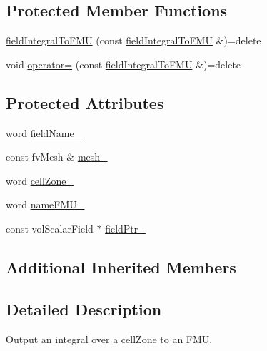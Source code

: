 \subsection*{Protected Member Functions}
\begin{DoxyCompactItemize}
\item 
\hyperlink{classFoam_1_1externalIOObject_1_1fieldIntegralToFMU_a6595a412b57d560957ed200ea1db6143}{field\+Integral\+To\+F\+MU} (const \hyperlink{classFoam_1_1externalIOObject_1_1fieldIntegralToFMU}{field\+Integral\+To\+F\+MU} \&)=delete
\item 
void \hyperlink{classFoam_1_1externalIOObject_1_1fieldIntegralToFMU_ad4a2e436a6117acae5d91778db665dcf}{operator=} (const \hyperlink{classFoam_1_1externalIOObject_1_1fieldIntegralToFMU}{field\+Integral\+To\+F\+MU} \&)=delete
\end{DoxyCompactItemize}
\subsection*{Protected Attributes}
\begin{DoxyCompactItemize}
\item 
word \hyperlink{classFoam_1_1externalIOObject_1_1fieldIntegralToFMU_a84505e826985ad10d53f4063d43128ea}{field\+Name\+\_\+}
\item 
const fv\+Mesh \& \hyperlink{classFoam_1_1externalIOObject_1_1fieldIntegralToFMU_a23edeeeecebcef11921a33dd5d990570}{mesh\+\_\+}
\item 
word \hyperlink{classFoam_1_1externalIOObject_1_1fieldIntegralToFMU_ad2969f803f6aad7e5eec24269d9ae443}{cell\+Zone\+\_\+}
\item 
word \hyperlink{classFoam_1_1externalIOObject_1_1fieldIntegralToFMU_a46bd1678875f6d9d0a01f3b93342b00a}{name\+F\+M\+U\+\_\+}
\item 
const vol\+Scalar\+Field $\ast$ \hyperlink{classFoam_1_1externalIOObject_1_1fieldIntegralToFMU_af89e3827787d41b150d0943b9dcde75f}{field\+Ptr\+\_\+}
\end{DoxyCompactItemize}
\subsection*{Additional Inherited Members}


\subsection{Detailed Description}
Output an integral over a cell\+Zone to an F\+MU. 

